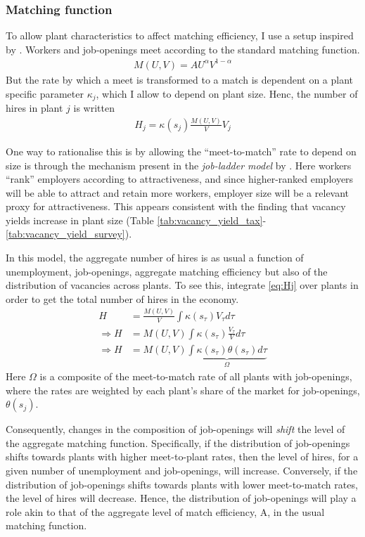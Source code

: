 \subsubsection{Matching function}

To allow plant characteristics to affect matching efficiency, I use a setup inspired by \cite{Kroft2016}. Workers and job-openings meet according to the standard matching function.
\begin{align}
M(U,V)=AU^{\alpha}V^{1-\alpha} \label{eq:Hj}
\end{align}
But the rate by which a meet is transformed to a match is dependent on a plant specific parameter $\kappa_j$, which I allow to depend on plant size. Henc, the number of hires in plant $j$ is written
\begin{align}
H_{j}=\kappa\left( s_j \right) \frac{M(U,V)}{V} V_j \label{eq:Hj}
\end{align}

One way to rationalise this is by allowing the \enquote{meet-to-match} rate to depend on size is through the mechanism present in the \emph{job-ladder model} by \cite{Moscarini2016}. Here workers \enquote{rank} employers according to attractiveness, and since higher-ranked employers will be able to attract and retain more workers, employer size will be a relevant proxy for attractiveness. This appears consistent with the finding that vacancy yields increase in plant size (Table \ref{tab:vacancy_yield_tax}-\ref{tab:vacancy_yield_survey}).

In this model, the aggregate number of hires is as usual a function of unemployment, job-openings, aggregate matching efficiency but also of the distribution of vacancies across plants. To see this, integrate \eqref{eq:Hj} over plants in order to get the total number of hires in the economy. 
\begin{align}
H&=\frac{M(U,V)}{V} \int \kappa(s_\tau) V_\tau d \tau \nonumber\\
\Rightarrow H&=M(U,V) \int \kappa(s_\tau) \frac{V_\tau}{V} d \tau \nonumber\\
\Rightarrow H&=M(U,V) \underbrace{\int \kappa(s_\tau) \theta(s_\tau) d \tau}_{\Omega} \label{eq:H}
\end{align}
Here $\Omega$ is a composite of the meet-to-match rate of all plants with job-openings, where the rates are weighted by each plant’s share of the market for job-openings, $\theta(s_j)$. 

Consequently, changes in the composition of job-openings will \emph{shift} the level of the aggregate matching function. Specifically, if the distribution of job-openings shifts towards plants with higher meet-to-plant rates, then the level of hires, for a given number of unemployment and job-openings, will increase. Conversely, if the distribution of job-openings shifts towards plants with lower meet-to-match rates, the level of hires will decrease. Hence, the distribution of job-openings will play a role akin to that of the aggregate level of match efficiency, A, in the usual matching function. 

